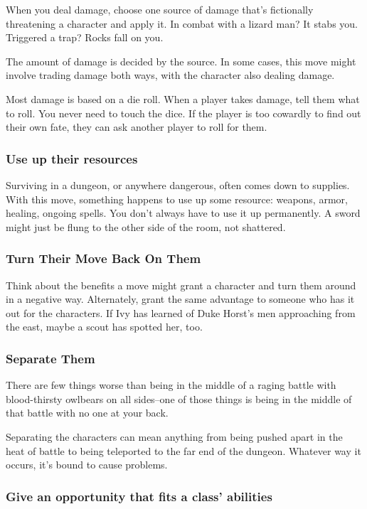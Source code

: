 When you deal damage, choose one source of damage that's fictionally threatening a character and apply it. In combat with a lizard man? It stabs you. Triggered a trap? Rocks fall on you.

The amount of damage is decided by the source. In some cases, this move might involve trading damage both ways, with the character also dealing damage.

Most damage is based on a die roll. When a player takes damage, tell them what to roll. You never need to touch the dice. If the player is too cowardly to find out their own fate, they can ask another player to roll for them.
\subsubsection{Use up their resources}

Surviving in a dungeon, or anywhere dangerous, often comes down to supplies. With this move, something happens to use up some resource: weapons, armor, healing, ongoing spells. You don't always have to use it up permanently. A sword might just be flung to the other side of the room, not shattered.
\subsubsection{Turn Their Move Back On Them}

Think about the benefits a move might grant a character and turn them around in a negative way. Alternately, grant the same advantage to someone who has it out for the characters. If Ivy has learned of Duke Horst's men approaching from the east, maybe a scout has spotted her, too.
\subsubsection{Separate Them}

There are few things worse than being in the middle of a raging battle with blood-thirsty owlbears on all sides--one of those things is being in the middle of that battle with no one at your back.

Separating the characters can mean anything from being pushed apart in the heat of battle to being teleported to the far end of the dungeon. Whatever way it occurs, it's bound to cause problems.
\subsubsection{Give an opportunity that fits a class' abilities}

